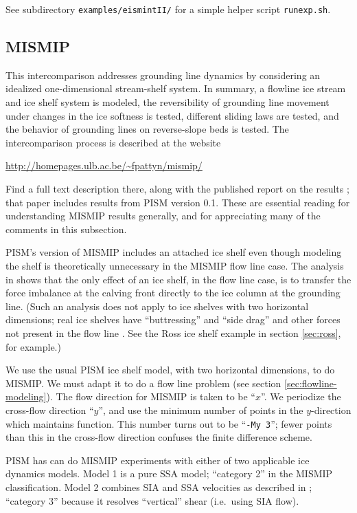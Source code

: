 See subdirectory \verb|examples/eismintII/| for a simple helper script \verb|runexp.sh|.


\subsection{MISMIP}\label{subsect:MISMIP}

This intercomparison addresses grounding line dynamics by considering an idealized one-dimensional stream-shelf system.  In summary, a flowline ice stream and ice shelf system is modeled, the reversibility of grounding line movement under changes in the ice softness is tested, different sliding laws are tested, and the behavior of grounding lines on reverse-slope beds is tested.  The intercomparison process is described at the website

\centerline{\url{http://homepages.ulb.ac.be/~fpattyn/mismip/}}

\noindent Find a full text description there, along with the published report on the results \cite{MISMIP2012}; that paper includes results from PISM version 0.1.  These are essential reading for understanding MISMIP results generally, and for appreciating many of the comments in this subsection.

PISM's version of MISMIP includes an attached ice shelf even though modeling the shelf is theoretically unnecessary in the MISMIP flow line case.  The analysis in \cite{SchoofMarine1} shows that the only effect of an ice shelf, in the flow line case, is to transfer the force imbalance at the calving front directly to the ice column at the grounding line.  (Such an analysis does not apply to ice shelves with two horizontal dimensions; real ice shelves have ``buttressing'' and ``side drag'' and other forces not present in the flow line \cite{Goldbergetal2009}.  See the Ross ice shelf example in section \ref{sec:ross}, for example.)

We use the usual PISM ice shelf model, with two horizontal dimensions, to do MISMIP.  We must adapt it to do a flow line problem (see section \ref{sec:flowline-modeling}).  The flow direction for MISMIP is taken to be ``$x$''.  We periodize the cross-flow direction ``$y$'', and use the minimum number of points in the $y$-direction which maintains function.  This number turns out to be ``\texttt{-My 3}''; fewer points than this in the cross-flow direction confuses the finite difference scheme.

PISM has can do MISMIP experiments with either of two applicable ice dynamics models.  Model 1 is a pure SSA model; ``category 2'' in the MISMIP classification.  Model 2 combines SIA and SSA velocities as described in \cite{Winkelmannetal2011}; ``category 3'' because it resolves ``vertical'' shear (i.e.~using SIA flow).

